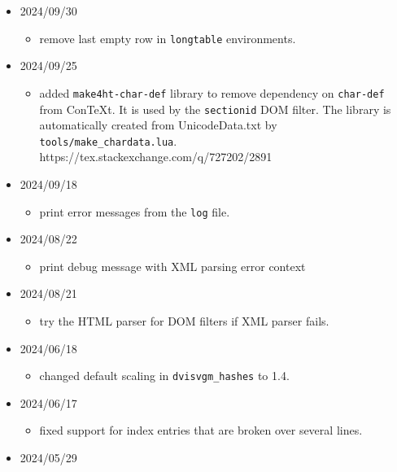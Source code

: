\begin{itemize}
  \begin{itemize}
  \tightlist
  \item
    version \texttt{0.4a} released.
  \end{itemize}
\item
  2024/09/30

  \begin{itemize}
  \tightlist
  \item
    remove last empty row in \texttt{longtable} environments.
  \end{itemize}
\item
  2024/09/25

  \begin{itemize}
  \tightlist
  \item
    added \texttt{make4ht-char-def} library to remove dependency on
    \texttt{char-def} from ConTeXt. It is used by the \texttt{sectionid}
    DOM filter. The library is automatically created from
    UnicodeData.txt by \texttt{tools/make\_chardata.lua}.
    https://tex.stackexchange.com/q/727202/2891
  \end{itemize}
\item
  2024/09/18

  \begin{itemize}
  \tightlist
  \item
    print error messages from the \texttt{log} file.
  \end{itemize}
\item
  2024/08/22

  \begin{itemize}
  \tightlist
  \item
    print debug message with XML parsing error context
  \end{itemize}
\item
  2024/08/21

  \begin{itemize}
  \tightlist
  \item
    try the HTML parser for DOM filters if XML parser fails.
  \end{itemize}
\item
  2024/06/18

  \begin{itemize}
  \tightlist
  \item
    changed default scaling in \texttt{dvisvgm\_hashes} to 1.4.
  \end{itemize}
\item
  2024/06/17

  \begin{itemize}
  \tightlist
  \item
    fixed support for index entries that are broken over several lines.
  \end{itemize}
\item
  2024/05/29


\end{itemize}
